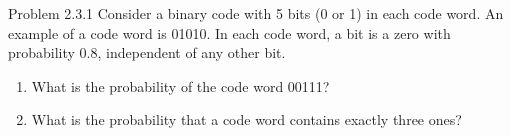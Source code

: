 \begin{problem}{Problem 2.3.1}
    Consider a binary code with 5 bits (0 or 1) in each code word. An example of a code word is 01010. In each code word, a bit is a zero with probability 0.8, independent of any other bit.
    \begin{enumerate}
        \item What is the probability of the code word 00111?
        \item What is the probability that a code word contains exactly three ones?
    \end{enumerate}
\end{problem}
